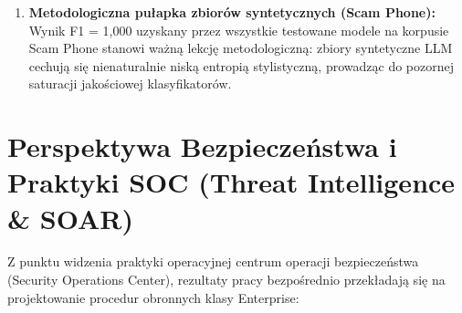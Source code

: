 \documentclass[12pt,a4paper,twoside]{report}
\begin{document}
\begin{enumerate}[leftmargin=1.5em]
  \item \textbf{Metodologiczna pułapka zbiorów syntetycznych (Scam Phone):} Wynik F1 = 1,000 uzyskany przez wszystkie testowane modele na korpusie Scam Phone stanowi ważną lekcję metodologiczną: zbiory syntetyczne LLM cechują się nienaturalnie niską entropią stylistyczną, prowadząc do pozornej saturacji jakościowej klasyfikatorów.
\end{enumerate}

\section{Perspektywa Bezpieczeństwa i Praktyki SOC (Threat Intelligence \& SOAR)}\label{sec:soc}
Z punktu widzenia praktyki operacyjnej centrum operacji bezpieczeństwa (Security Operations Center), rezultaty pracy bezpośrednio przekładają się na projektowanie procedur obronnych klasy Enterprise:
\end{document}
